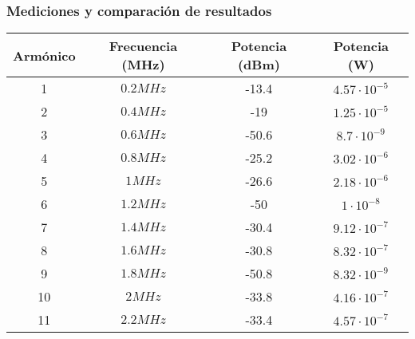 \documentclass[../../labo_tp5_main.tex]{subfiles}
\begin{document}
\subsubsection{Mediciones y comparación de resultados}
\begin{table}[H] %
	\centering
 		\begin{tabular}{||c c c c||} 
 			\hline
			Armónico & Frecuencia (MHz) & Potencia (dBm) & Potencia (W)\\ [0.5ex] 
 			\hline\hline
			1 & $0.2MHz$ & -13.4 & $4.57\cdot 10^{-5}$\\
			2 & $0.4MHz$ & -19 & $1.25\cdot 10^{-5}$\\
			3 & $0.6MHz$ & -50.6 & $8.7\cdot 10^{-9}$\\
			4 & $0.8MHz$ & -25.2 & $3.02\cdot 10^{-6}$\\
			5 & $1MHz$ & -26.6 & $2.18\cdot 10^{-6}$\\
			6 & $1.2MHz$ & -50 & $1\cdot 10^{-8}$\\
			7 & $1.4MHz$ & -30.4 & $9.12\cdot 10^{-7}$\\
			8 & $1.6MHz$ & -30.8 & $8.32\cdot 10^{-7}$\\
			9 & $1.8MHz$ & -50.8 & $8.32\cdot 10^{-9}$\\
			10 & $2MHz$ & -33.8 & $4.16\cdot 10^{-7}$\\
			11 & $2.2MHz$ & -33.4 & $4.57\cdot 10^{-7}$\\[1ex] 
			\hline
		\end{tabular}
\end{table}
\end{document}
